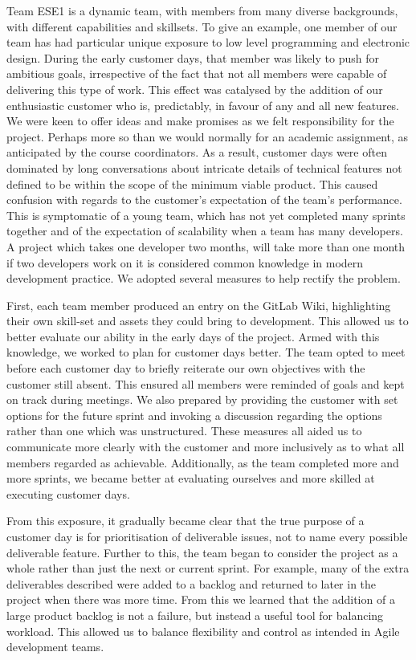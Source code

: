 \documentclass{l3proj}
\begin{document}
Team ESE1 is a dynamic team, with members from many diverse backgrounds, with different capabilities and skillsets. To give an example, one member of our team has had particular unique exposure to low level programming and electronic design. During the early customer days, that member was likely to push for ambitious goals, irrespective of the fact that not all members were capable of delivering this type of work. This effect was catalysed by the addition of our enthusiastic customer who is, predictably, in favour of any and all new features. We were keen to offer ideas and make promises as we felt responsibility for the project. Perhaps more so than we would normally for an academic assignment, as anticipated by the course coordinators\cite{simpson}. As a result, customer days were often dominated by long conversations about intricate details of technical features not defined to be within the scope of the minimum viable product. This caused confusion with regards to the customer's expectation of the team's performance. This is symptomatic of a young team, which has not yet completed many sprints together and of the expectation of scalability when a team has many developers. A project which takes one developer two months, will take more than one month if two developers work on it\cite{brooks} is considered common knowledge in modern development practice\cite{hanakawa}. We adopted several measures to help rectify the problem. 

First, each team member produced an entry on the GitLab Wiki, highlighting their own skill-set and assets they could bring to development. This allowed us to better evaluate our ability in the early days of the project. Armed with this knowledge, we worked to plan for customer days better. The team opted to meet before each customer day to briefly reiterate our own objectives with the customer still absent. This ensured all members were reminded of goals and kept on track during meetings. We also prepared by providing the customer with set options for the future sprint and invoking a discussion regarding the options rather than one which was unstructured. These measures all aided us to communicate more clearly with the customer and more inclusively as to what all members regarded as achievable. Additionally, as the team completed more and more sprints, we became better at evaluating ourselves and more skilled at executing customer days.

From this exposure, it gradually became clear that the true purpose of a customer day is for prioritisation of deliverable issues, not to name every possible deliverable feature. Further to this, the team began to consider the project as a whole rather than just the next or current sprint. For example, many of the extra deliverables described were added to a backlog and returned to later in the project when there was more time. From this we learned that the addition of a large product backlog is not a failure, but instead a useful tool for balancing workload. This allowed us to balance flexibility and control as intended in Agile development teams\cite{rising}.
 
\end{document}
